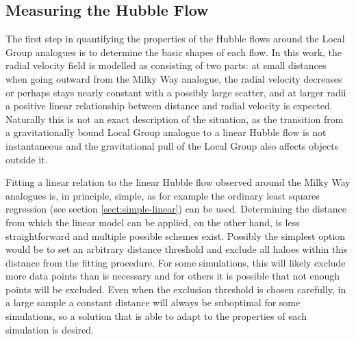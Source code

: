 \documentclass[english, oneside]{HYgradu}
\begin{document}
\subsection{Measuring the Hubble Flow} \label{sect:hubblemeasurement}
The first step in quantifying the properties of the Hubble flows around the Local Group analogues is to determine the basic shapes of each flow. In this work, the radial velocity field is modelled as consisting of two parts: at small distances when going outward from the Milky Way analogue, the radial velocity decreases or perhaps stays nearly constant with a possibly large scatter, and at larger radii a positive linear relationship between distance and radial velocity is expected. Naturally this is not an exact description of the situation, as the transition from a gravitationally bound Local Group analogue to a linear Hubble flow is not instantaneous and the gravitational pull of the Local Group also affects objects outside it.

Fitting a linear relation to the linear Hubble flow observed around the Milky Way analogues is, in principle, simple, as for example the ordinary least squares regression (see section \ref{sect:simple-linear}) can be used. Determining the distance from which the linear model can be applied, on the other hand, is less straightforward and multiple possible schemes exist. Possibly the simplest option would be to set an arbitrary distance threshold and exclude all haloes within this distance from the fitting procedure. For some simulations, this will likely exclude more data points than is necessary and for others it is possible that not enough points will be excluded. Even when the exclusion threshold is chosen carefully, in a large sample a constant distance will always be suboptimal for some simulations, so a solution that is able to adapt to the properties of each simulation is desired.
\end{document}
